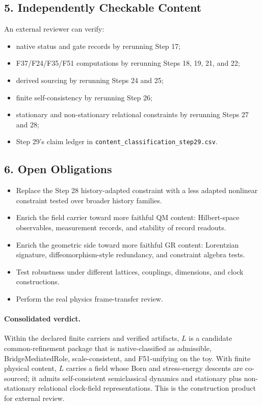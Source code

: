 \subsection*{5. Independently Checkable Content}

An external reviewer can verify:
\begin{itemize}
\item native status and gate records by rerunning Step 17;
\item F37/F24/F35/F51 computations by rerunning Steps 18, 19, 21, and 22;
\item derived sourcing by rerunning Steps 24 and 25;
\item finite self-consistency by rerunning Step 26;
\item stationary and non-stationary relational constraints by rerunning Steps
  27 and 28;
\item Step 29's claim ledger in
  \texttt{content\_classification\_step29.csv}.
\end{itemize}

\subsection*{6. Open Obligations}

\begin{itemize}
\item Replace the Step 28 history-adapted constraint with a less adapted
  nonlinear constraint tested over broader history families.
\item Enrich the field carrier toward more faithful QM content: Hilbert-space
  observables, measurement records, and stability of record readouts.
\item Enrich the geometric side toward more faithful GR content: Lorentzian
  signature, diffeomorphism-style redundancy, and constraint algebra tests.
\item Test robustness under different lattices, couplings, dimensions, and
  clock constructions.
\item Perform the real physics frame-transfer review.
\end{itemize}

\paragraph{Consolidated verdict.}
Within the declared finite carriers and verified artifacts, \(L\) is a
candidate common-refinement package that is native-classified as admissible,
BridgeMediatedRole, scale-consistent, and F51-unifying on the toy.  With
finite physical content, \(L\) carries a field whose Born and stress-energy
descents are co-sourced; it admits self-consistent semiclassical dynamics and
stationary plus non-stationary relational clock-field representations.  This
is the construction product for external review.
